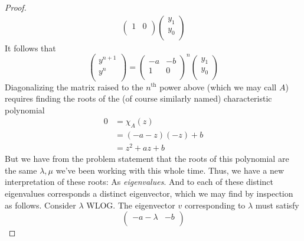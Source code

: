 \documentclass[../psets.tex]{subfiles}
\begin{document}
\begin{enumerate}
\begin{enumerate}
\begin{proof}
\begin{align*}
\begin{pmatrix}
                    1 & 0\\
                \end{pmatrix}
                \begin{pmatrix}
                    y_1\\
                    y_0\\
                \end{pmatrix}
            \end{align*}
            It follows that
            \begin{equation*}
                \begin{pmatrix}
                    y^{n+1}\\
                    y^n\\
                \end{pmatrix}
                =
                \begin{pmatrix}
                    -a & -b\\
                    1 & 0\\
                \end{pmatrix}^n
                \begin{pmatrix}
                    y_1\\
                    y_0\\
                \end{pmatrix}
            \end{equation*}
            Diagonalizing the matrix raised to the $n^\text{th}$ power above (which we may call $A$) requires finding the roots of the (of course similarly named) characteristic polynomial
            \begin{align*}
                0 &= \chi_A(z)\\
                &= (-a-z)(-z)+b\\
                &= z^2+az+b
            \end{align*}
            But we have from the problem statement that the roots of this polynomial are the same $\lambda,\mu$ we've been working with this whole time. Thus, we have a new interpretation of these roots: As \emph{eigenvalues}. And to each of these distinct eigenvalues corresponds a distinct eigenvector, which we may find by inspection as follows. Consider $\lambda$ WLOG. The eigenvector $v$ corresponding to $\lambda$ must satisfy
            \begin{equation*}
                \begin{pmatrix}
                    -a-\lambda & -b\\

\end{pmatrix}
\end{equation*}
\end{proof}
\end{enumerate}
\end{enumerate}
\end{document}
